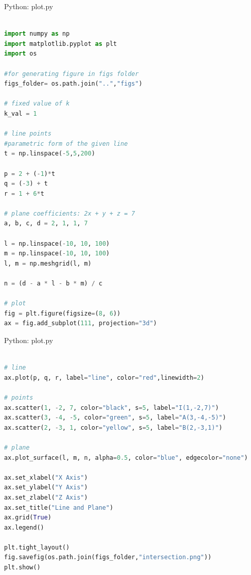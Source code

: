 \documentclass{beamer}
\numberwithin{equation}{section}
\theoremstyle{remark}
\begin{document}
\begin{frame}[fragile]{Python: plot.py}
\begin{lstlisting}[language=Python]

import numpy as np
import matplotlib.pyplot as plt
import os 

#for generating figure in figs folder
figs_folder= os.path.join("..","figs")

# fixed value of k
k_val = 1

# line points
#parametric form of the given line
t = np.linspace(-5,5,200)

p = 2 + (-1)*t
q = (-3) + t
r = 1 + 6*t

# plane coefficients: 2x + y + z = 7
a, b, c, d = 2, 1, 1, 7

l = np.linspace(-10, 10, 100)
m = np.linspace(-10, 10, 100)
l, m = np.meshgrid(l, m)

n = (d - a * l - b * m) / c

# plot
fig = plt.figure(figsize=(8, 6))
ax = fig.add_subplot(111, projection="3d")

\end{lstlisting}
\end{frame}

\begin{frame}[fragile]{Python: plot.py}
\begin{lstlisting}[language=Python]

# line
ax.plot(p, q, r, label="line", color="red",linewidth=2)

# points
ax.scatter(1, -2, 7, color="black", s=5, label="I(1,-2,7)")
ax.scatter(3, -4, -5, color="green", s=5, label="A(3,-4,-5)")
ax.scatter(2, -3, 1, color="yellow", s=5, label="B(2,-3,1)")

# plane
ax.plot_surface(l, m, n, alpha=0.5, color="blue", edgecolor="none")

ax.set_xlabel("X Axis")
ax.set_ylabel("Y Axis")
ax.set_zlabel("Z Axis")
ax.set_title("Line and Plane")
ax.grid(True)
ax.legend()

plt.tight_layout()
fig.savefig(os.path.join(figs_folder,"intersection.png"))
plt.show()

\end{lstlisting}
\end{frame}
\end{document}
